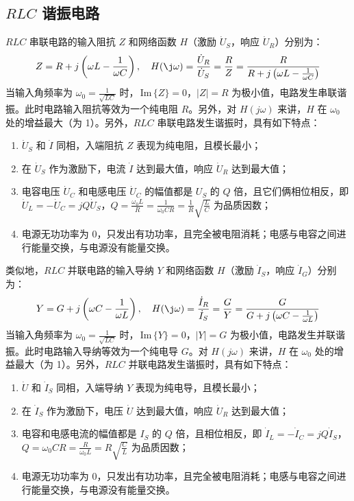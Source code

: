 \documentclass[UTF8]{report}
\def\Im{\,\mathrm{Im}\,}
\theoremstyle{MyLineTheoremStyle} %
\theoremstyle{MyBlockTheoremStyle} %
\theoremstyle{MySubsubsectionStyle} %
\begin{document}
\subsection{$RLC$ 谐振电路}
$RLC$ 串联电路的输入阻抗 $Z$ 和网络函数 $H$（激励 $\dot{U}_S$，响应 $\dot{U}_{R}$）分别为：
\begin{equation}
Z = R + j \left(\omega L - \frac{1}{\omega C}\right),\quad 
H(\j\omega) = \frac{\dot{U}_R}{\dot{U}_S} = \frac{R}{Z} = \frac{R}{R + j \left(\omega L - \frac{1}{\omega C}\right)}
\end{equation}
当输入角频率为 $\omega_0 = \frac{1}{\sqrt{LC}}$ 时，$\Im \{Z\} = 0$，$|Z| = R$ 为极小值，电路发生串联谐振。此时电路输入阻抗等效为一个纯电阻 $R$。另外，对 $H(j\omega)$ 来讲，$H$ 在 $\omega_0$ 处的增益最大（为 1）。另外，$RLC$ 串联电路发生谐振时，具有如下特点：
\begin{enumerate}
\item $\dot{U}_S$ 和 $\dot{I}$ 同相，入端阻抗 $Z$ 表现为纯电阻，且模长最小；
\item 在 $\dot{U}_S$ 作为激励下，电流 $\dot{I}$ 达到最大值，响应 $\dot{U}_R$ 达到最大值；
\item 电容电压 $\dot{U}_C$ 和电感电压 $\dot{U}_C$ 的幅值都是 $U_S$ 的 $Q$ 倍，且它们俩相位相反，即 $\dot{U}_L = -\dot{U}_C = j Q \dot{U}_S$，$Q = \frac{\omega_0 L}{R} = \frac{1}{\omega_0 CR} = \frac{1}{R}\sqrt{\frac{L}{C}}$ 为品质因数；
\item 电源无功功率为 0，只发出有功功率，且完全被电阻消耗；电感与电容之间进行能量交换，与电源没有能量交换。
\end{enumerate}


类似地，$RLC$ 并联电路的输入导纳 $Y$ 和网络函数 $H$（激励 $\dot{I}_S$，响应 $\dot{I}_{G}$）分别为：
\begin{equation}
Y = G + j \left(\omega C - \frac{1}{\omega L}\right),\quad
H(\j\omega) = \frac{\dot{I}_R}{\dot{I}_S} = \frac{G}{Y} = \frac{G}{G + j \left(\omega C - \frac{1}{\omega L}\right)}
\end{equation}
当输入角频率为 $\omega_0 = \frac{1}{\sqrt{LC}}$ 时，$\Im \{Y\} = 0$，$|Y| = G$ 为极小值，电路发生并联谐振。此时电路输入导纳等效为一个纯电导 $G$。对 $H(j\omega)$ 来讲，$H$ 在 $\omega_0$ 处的增益最大（为 1）。另外，$RLC$ 并联电路发生谐振时，具有如下特点：
\begin{enumerate}
\item $\dot{U}$ 和 $\dot{I}_S$ 同相，入端导纳 $Y$ 表现为纯电导，且模长最小；
\item 在 $\dot{I}_S$ 作为激励下，电压 $\dot{U}$ 达到最大值，响应 $\dot{U}_R$ 达到最大值；
\item 电容和电感电流的幅值都是 $I_S$ 的 $Q$ 倍，且相位相反，即 $\dot{I}_L = -\dot{I}_C = jQ \dot{I}_S$，$Q = \omega_0 C R = \frac{R}{\omega_0 L} = R\sqrt{\frac{C}{L}}$ 为品质因数；
\item 电源无功功率为 0，只发出有功功率，且完全被电阻消耗；电感与电容之间进行能量交换，与电源没有能量交换。
\end{enumerate}
\end{document}
